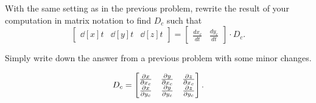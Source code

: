 \documentclass{ximera}
\begin{document}
\begin{problem}
  With the same setting as in the previous problem, rewrite the result
  of your computation in matrix notation to find $D_c$
  such that
\[
\begin{bmatrix}
\dd[x]{t} & \dd[y]{t} & \dd[z]{t}
\end{bmatrix}
=
\begin{bmatrix}
\frac{dx_c}{dt} & \frac{dy_c}{dt}
\end{bmatrix}\cdot D_c.
\]
\begin{hint}
  Simply write down the answer from a previous problem with some minor
  changes.
\end{hint}
\begin{freeResponse}
  \[
  D_c =
  \begin{bmatrix}
    \pp[x]{x_c} & \pp[y]{x_c} & \pp[z]{x_c} \\
    \pp[x]{y_c}   & \pp[y]{y_c}   & \pp[z]{y_c}
  \end{bmatrix}.
  \]
\end{freeResponse}
\end{problem}
\end{document}
